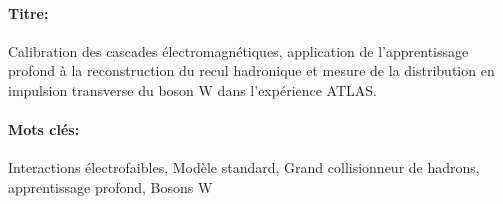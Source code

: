 \begin{mdframed}[linecolor=Prune,linewidth=1]

\vspace{-.25cm}
\paragraph*{Titre:} Calibration des cascades électromagnétiques, application de l’apprentissage profond à la reconstruction du recul hadronique et mesure de la distribution en impulsion transverse du boson W dans l'expérience ATLAS.

\begin{small}
\vspace{-.25cm}
\paragraph*{Mots clés:} Interactions électrofaibles, Modèle standard, Grand collisionneur de hadrons, apprentissage profond, Bosons W

\vspace{-.5cm}
\begin{multicols}{2}

\end{multicols}
\end{small}
\end{mdframed}
